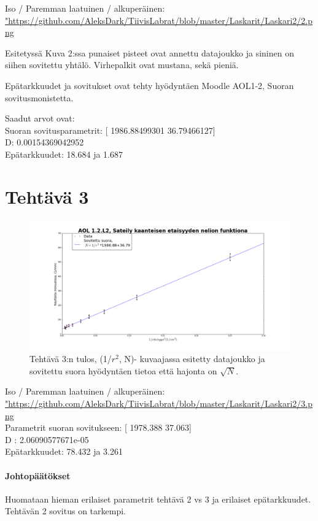 \documentclass[a4paper, 12pt]{article}
\begin{document}
Iso / Paremman laatuinen / alkuperäinen: \url{"https://github.com/AleksDark/TiivisLabrat/blob/master/Laskarit/Laskari2/2.png}

Esitetyssä Kuva 2:ssa punaiset pisteet ovat annettu datajoukko ja  sininen on siihen sovitettu yhtälö. Virhepalkit ovat mustana, sekä pieniä.

Epätarkkuudet ja sovitukset ovat tehty hyödyntäen Moodle AOL1-2, Suoran sovitusmonistetta.

Saadut arvot ovat:\\
Suoran sovitusparametrit:  [ 1986.88499301    36.79466127]\\
D:  0.00154369042952 \\
Epätarkkuudet: 18.684 ja 1.687

\section*{Tehtävä 3}
\begin{figure}
\includegraphics[width=1\textwidth]{3}
\caption{Tehtävä 3:n tulos, (1/$r^2$, N)- kuvaajassa esitetty datajoukko ja sovitettu suora hyödyntäen tietoa että hajonta on $\sqrt{N}$.}
\end{figure}

Iso / Paremman laatuinen / alkuperäinen: \url{"https://github.com/AleksDark/TiivisLabrat/blob/master/Laskarit/Laskari2/3.png}\\

Parametrit suoran sovitukseen:  [ 1978.388    37.063]\\
D : 2.06090577671e-05\\
Epätarkkuudet:  78.432 ja 3.261


\paragraph{Johtopäätökset}
Huomataan hieman erilaiset parametrit tehtävä 2 vs 3 ja erilaiset epätarkkuudet. Tehtävän 2 sovitus on tarkempi.
\end{document}
